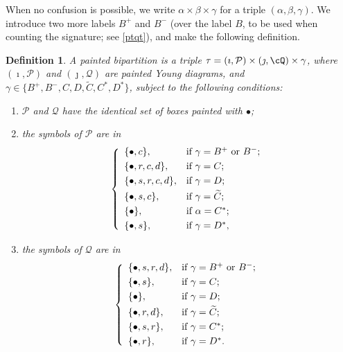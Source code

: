\documentclass[11pt,a4paper]{amsart}
\newcommand{\CP}{{\mathcal {P}}}
\numberwithin{equation}{section}
\newtheorem{defn}[thm]{Definition}
\theoremstyle{remark}
\begin{document}
When no confusion is possible, we write $\alpha\times \beta\times \gamma$ for a triple $(\alpha, \beta, \gamma)$.   We introduce two more labels $B^+$ and $B^-$ (over the label $B$, to be  used when counting the signature; see \eqref{ptqt}), and make the following definition.
 \begin{defn}\label{defpbp0}
 A painted bipartition is a triple
  $\tau=(\imath, \CP)\times (\jmath, \cQ)\times \gamma$, where $(\imath, \CP)$
  and $ (\jmath, \mathcal Q)$ are painted Young diagrams, and
  $\gamma \in \{B^+,B^-, C,D,\widetilde {C}, C^*, D^*\}$, subject to the
  following conditions:
  \begin{enumerate}
 \item $\CP$ and $\mathcal Q$ have the identical set of boxes painted with $\bullet$;
    \item the symbols of $\CP$ are in
          \[
          \left\{
          \begin{array}{ll}
            \{\bullet, c\}, &\hbox{if $\gamma=B^+$ or $B^-$}; \smallskip\\
            \{\bullet,  r, c,d\}, &\hbox{if $\gamma=C$}; \smallskip\\
            \{\bullet, s, r, c,d\}, &\hbox{if $\gamma=D$}; \smallskip\\
            \{\bullet, s, c\}, &\hbox{if $\gamma=\widetilde{ C}$}; \smallskip \\
            \{\bullet\}, &\hbox{if $\alpha=C^*$}; \smallskip \\
            \{\bullet, s\}, &\hbox{if $\gamma=D^*$},\\
          \end{array}
          \right.
          \]
    \item the symbols of $\mathcal Q$ are in           \[
          \left\{
          \begin{array}{ll}
            \{\bullet, s, r, d\}, &\hbox{if $\gamma=B^+$ or $B^-$}; \smallskip\\
            \{\bullet, s\}, &\hbox{if $\gamma=C$}; \smallskip\\
            \{\bullet\}, &\hbox{if $\gamma=D$}; \smallskip\\
            \{\bullet, r, d\}, &\hbox{if $\gamma=\widetilde{ C}$}; \smallskip\\
            \{\bullet, s,r\}, &\hbox{if $\gamma=C^*$}; \smallskip \\
            \{\bullet, r\}, &\hbox{if $\gamma=D^*$}.
          \end{array}
          \right.
          \]

  \end{enumerate}
  \end{defn}
\end{document}
